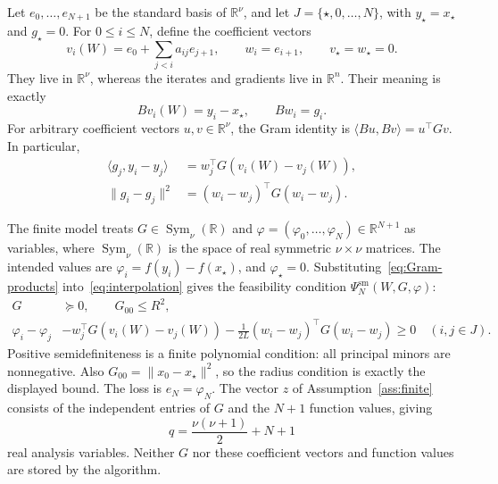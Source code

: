 \documentclass[11pt]{article}
\numberwithin{equation}{section}
\theoremstyle{definition}
\newcommand{\R}{\mathbb R}
\DeclareMathOperator{\Sym}{Sym}
\begin{document}
Let $e_0,\ldots,e_{N+1}$ be the standard basis of $\R^\nu$, and let $J=\{\star,0,\ldots,N\}$, with $y_\star=x_\star$ and $g_\star=0$. For $0\le i\le N$, define the coefficient vectors
\begin{equation}
 v_i(W)=e_0+\sum_{j<i}a_{ij}e_{j+1},\qquad w_i=e_{i+1},
 \qquad v_\star=w_\star=0.
 \label{eq:Gram-vectors}
\end{equation}
They live in $\R^\nu$, whereas the iterates and gradients live in $\R^n$. Their meaning is exactly
\begin{equation}
 Bv_i(W)=y_i-x_\star,\qquad Bw_i=g_i.
 \label{eq:Gram-representation}
\end{equation}
For arbitrary coefficient vectors $u,v\in\R^\nu$, the Gram identity is
$\langle Bu,Bv\rangle=u^\top Gv$. In particular,
\begin{align}
 \langle g_j,y_i-y_j\rangle
 &=w_j^\top G(v_i(W)-v_j(W)),\nonumber\\
 \|g_i-g_j\|^2&=(w_i-w_j)^\top G(w_i-w_j).
 \label{eq:Gram-products}
\end{align}

The finite model treats $G\in\Sym_\nu(\R)$ and $\varphi=(\varphi_0,\ldots,\varphi_N)\in\R^{N+1}$ as variables, where $\Sym_\nu(\R)$ is the space of real symmetric $\nu\times\nu$ matrices. The intended values are $\varphi_i=f(y_i)-f(x_\star)$, and $\varphi_\star=0$. Substituting~\eqref{eq:Gram-products} into~\eqref{eq:interpolation} gives the feasibility condition $\Psi_N^{\mathrm{sm}}(W,G,\varphi)$:
\begin{align}
 G&\succeq0,\qquad G_{00}\le R^2,\label{eq:Gram-constraints}\\
 \varphi_i-\varphi_j
 &-w_j^\top G(v_i(W)-v_j(W))
 -\frac1{2L}(w_i-w_j)^\top G(w_i-w_j)\ge0
 \quad(i,j\in J).\nonumber
\end{align}
Positive semidefiniteness is a finite polynomial condition: all principal minors are nonnegative. Also $G_{00}=\|x_0-x_\star\|^2$, so the radius condition is exactly the displayed bound. The loss is $e_N=\varphi_N$. The vector $z$ of Assumption~\ref{ass:finite} consists of the independent entries of $G$ and the $N+1$ function values, giving
\[
 q=\frac{\nu(\nu+1)}2+N+1
\]
real analysis variables. Neither $G$ nor these coefficient vectors and function values are stored by the algorithm.
\end{document}
